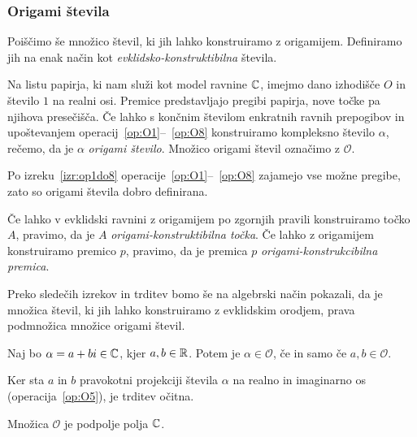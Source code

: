 \subsubsection{Origami števila}
\label{origami_konstruktibilnost}

Poiščimo še množico števil, ki jih lahko konstruiramo z origamijem. Definiramo jih na enak način kot \emph{evklidsko-konstruktibilna} števila.

\begin{definicija}
    \label{def:origami_stevilo}
    Na listu papirja, ki nam služi kot model ravnine $\mathbb C$, imejmo dano izhodišče $O$ in število $1$ na realni osi. Premice predstavljajo pregibi papirja, nove točke pa njihova presečišča. Če lahko s končnim številom enkratnih ravnih prepogibov in upoštevanjem operacij~\ref{op:O1}--~\ref{op:O8} konstruiramo kompleksno število $\alpha$, rečemo, da je $\alpha$ \emph{origami število}. Množico origami števil označimo z $\mathcal{O}$.
\end{definicija}

\begin{opomba}
    Po izreku~\ref{izr:op1do8} operacije~\ref{op:O1}--~\ref{op:O8} zajamejo vse možne pregibe, zato so origami števila dobro definirana.
\end{opomba}

\begin{definicija}
    Če lahko v evklidski ravnini z origamijem po zgornjih pravili konstruiramo točko $A$, pravimo, da je $A$ \emph{origami-konstruktibilna točka}. Če lahko z origamijem konstruiramo premico $p$, pravimo, da je premica $p$ \emph{origami-konstrukcibilna premica}.
\end{definicija}

Preko sledečih izrekov in trditev bomo še na algebrski način pokazali, da je množica števil, ki jih lahko konstruiramo z evklidskim orodjem, prava podmnožica množice origami števil.

\begin{trditev}
    \label{trd:zaprt_koord}
    Naj bo $\alpha = a + bi \in \mathbb C$, kjer $a, b \in \mathbb R$. Potem je $\alpha \in \mathcal{O}$, če in samo če $a, b \in \mathcal{O}$.
\end{trditev}
\begin{dokaz}
    Ker sta $a$ in $b$ pravokotni projekciji števila $\alpha$ na realno in imaginarno os (operacija~\ref{op:O5}), je trditev očitna.
\end{dokaz}

\begin{izrek}
    \label{izr:podpolje}
    Množica $\mathcal{O}$ je podpolje polja $\mathbb C$.
\end{izrek}

